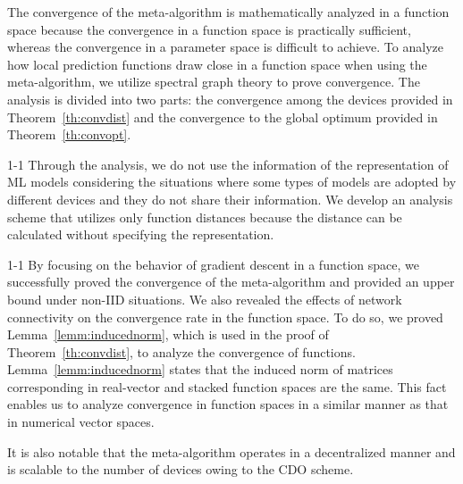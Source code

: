 \documentclass[journal]{IEEEtran}
\begin{document}
The convergence of the meta-algorithm is mathematically analyzed in a function space
because the convergence in a function space is practically sufficient,
whereas the convergence in a parameter space is difficult to achieve.
To analyze how local prediction functions draw close in a function space when using the meta-algorithm,
we utilize spectral graph theory to prove convergence.
The analysis is divided into two parts:
the convergence among the devices provided in Theorem~\ref{th:convdist}
and the convergence to the global optimum provided in Theorem~\ref{th:convopt}.
\begin{revhl}{1-1}
Through the analysis, we do not use the information of the representation of \gls{ML} models
considering the situations where some types of models are adopted by different devices
and they do not share their information.
We develop an analysis scheme that utilizes only function distances
because the distance can be calculated without specifying the representation.
\end{revhl} 

\begin{revhl}{1-1}
By focusing on the behavior of gradient descent in a function space,
we successfully proved the convergence of the meta-algorithm and provided an upper bound under non-\gls{IID} situations.
We also revealed the effects of network connectivity on the convergence rate in the function space.
To do so, we proved Lemma~\ref{lemm:inducednorm}, which is used in the proof of Theorem~\ref{th:convdist}, to analyze the convergence of functions.
Lemma~\ref{lemm:inducednorm} states that the induced norm of matrices corresponding in real-vector and stacked function spaces are the same.
This fact enables us to analyze convergence in function spaces in a similar manner as that in numerical vector spaces.
\end{revhl}
It is also notable that the meta-algorithm operates in a decentralized manner and is scalable to the number of devices owing to the \gls{CDO} scheme.
\end{document}
